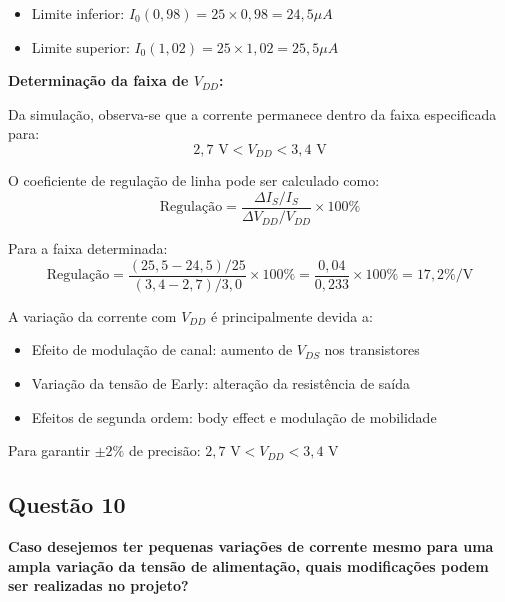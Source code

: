 ﻿\documentclass[12pt,a4paper]{article}
\begin{document}
\begin{itemize}
    \item Limite inferior: $I_0(0,98) = 25 \times 0,98 = 24,5 \mu A$
    \item Limite superior: $I_0(1,02) = 25 \times 1,02 = 25,5 \mu A$
\end{itemize}

\textbf{Determinação da faixa de $V_{DD}$:}

Da simulação, observa-se que a corrente permanece dentro da faixa especificada para:
\begin{equation}
2,7 \text{ V} < V_{DD} < 3,4 \text{ V}
\end{equation}



O coeficiente de regulação de linha pode ser calculado como:
\begin{equation*}
\text{Regulação} = \frac{\Delta I_S / I_S}{\Delta V_{DD} / V_{DD}} \times 100\%
\end{equation*}

Para a faixa determinada:
\begin{equation*}
\text{Regulação} = \frac{(25,5-24,5)/25}{(3,4-2,7)/3,0} \times 100\% = \frac{0,04}{0,233} \times 100\% = 17,2\%/\text{V}
\end{equation*}



A variação da corrente com $V_{DD}$ é principalmente devida a:
\begin{itemize}
    \item Efeito de modulação de canal: aumento de $V_{DS}$ nos transistores
    \item Variação da tensão de Early: alteração da resistência de saída
    \item Efeitos de segunda ordem: body effect e modulação de mobilidade
\end{itemize}



Para garantir $\pm 2\%$ de precisão: $\boxed{2,7 \text{ V} < V_{DD} < 3,4 \text{ V}}$

\subsection*{Questão 10}
\begin{BoxQ}
	\textbf{Caso desejemos ter pequenas variações de corrente mesmo para uma ampla variação da tensão de alimentação, quais modificações podem ser realizadas no projeto?}
\end{BoxQ}
\end{document}
